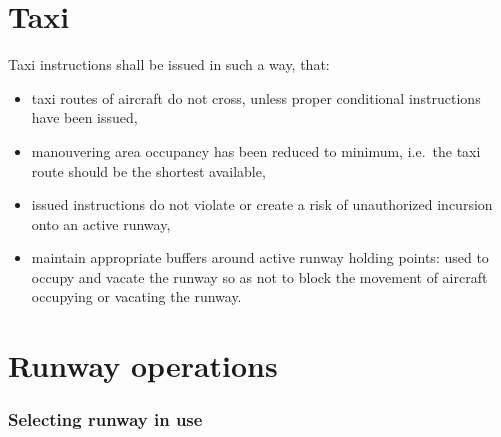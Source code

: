 \section{Taxi}

Taxi instructions shall be issued in such a way, that:
\begin{itemize}
	\item taxi routes of aircraft do not cross, unless proper conditional instructions have been issued,
	\item manouvering area occupancy has been reduced to minimum, i.e.\ the taxi route should be the shortest available,
	\item issued instructions do not violate or create a risk of unauthorized incursion onto an active runway,
	\item maintain appropriate buffers around active runway holding points: used to occupy and vacate the runway so as not to block the movement of aircraft occupying or vacating the runway.
\end{itemize}

\section{Runway operations}
\subsubsection{Selecting runway in use}

